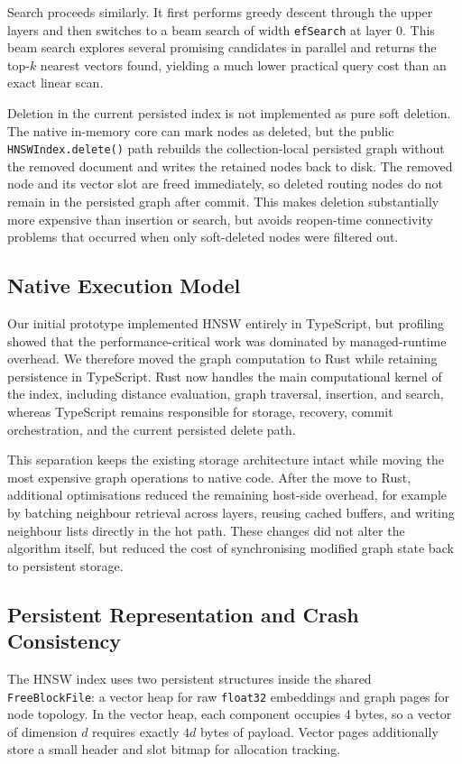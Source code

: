 \medskip
\noindent
Search proceeds similarly. It first performs greedy descent through the upper layers and then switches to a beam search of width \texttt{efSearch} at layer 0. This beam search explores several promising candidates in parallel and returns the top-$k$ nearest vectors found, yielding a much lower practical query cost than an exact linear scan.

\medskip
\noindent
Deletion in the current persisted index is not implemented as pure soft deletion. The native in-memory core can mark nodes as deleted, but the public \texttt{HNSWIndex.delete()} path rebuilds the collection-local persisted graph without the removed document and writes the retained nodes back to disk. The removed node and its vector slot are freed immediately, so deleted routing nodes do not remain in the persisted graph after commit. This makes deletion substantially more expensive than insertion or search, but avoids reopen-time connectivity problems that occurred when only soft-deleted nodes were filtered out.

\subsection{Native Execution Model}
Our initial prototype implemented HNSW entirely in TypeScript, but profiling showed that the performance-critical work was dominated by managed-runtime overhead. We therefore moved the graph computation to Rust while retaining persistence in TypeScript. Rust now handles the main computational kernel of the index, including distance evaluation, graph traversal, insertion, and search, whereas TypeScript remains responsible for storage, recovery, commit orchestration, and the current persisted delete path.

\medskip
\noindent
This separation keeps the existing storage architecture intact while moving the most expensive graph operations to native code. After the move to Rust, additional optimisations reduced the remaining host-side overhead, for example by batching neighbour retrieval across layers, reusing cached buffers, and writing neighbour lists directly in the hot path. These changes did not alter the algorithm itself, but reduced the cost of synchronising modified graph state back to persistent storage.

\subsection{Persistent Representation and Crash Consistency}
The HNSW index uses two persistent structures inside the shared \texttt{FreeBlockFile}: a vector heap for raw \texttt{float32} embeddings and graph pages for node topology. In the vector heap, each component occupies 4 bytes, so a vector of dimension $d$ requires exactly $4d$ bytes of payload. Vector pages additionally store a small header and slot bitmap for allocation tracking.

